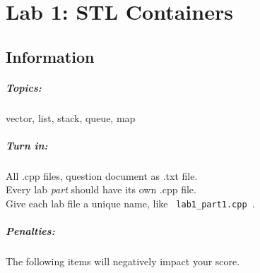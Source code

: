 \documentclass[a4paper,12pt]{book}
\title{}
\author{Rachel Morris}
\date{\today}
\begin{document}
    \chapter*{Lab 1: STL Containers} 
        \section*{Information}
            \paragraph{ Topics: } vector, list, stack, queue, map
            \paragraph{ Turn in: } All .cpp files, question document as .txt file. \\
                \tab[2.3cm] Every lab \textit{ part } should have its own .cpp file. \\
                \tab[2.3cm] Give each lab file a unique name, like \texttt{ lab1\_part1.cpp }.

            \paragraph{ Penalties: }
                The following items will negatively impact your score.
\end{document}
